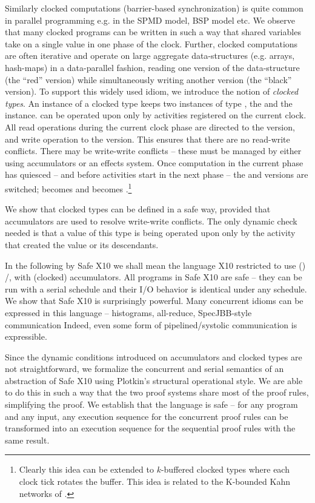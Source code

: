 Similarly clocked computations (barrier-based synchronization) is
quite common in parallel programming e.g. in the SPMD model, BSP model
etc. We observe that many clocked programs can be written in such a
way that shared variables take on a single value in one phase of the
clock. Further, clocked computations are often iterative and operate
on large aggregate data-structures (e.g. arrays, hash-maps) in a
data-parallel fashion, reading one version of the data-structure (the
``red'' version) while simultaneously writing another version (the
 ``black'' version). To support this widely used idiom, we introduce
the notion of {\em clocked types}. An instance  of a  clocked type
 keeps two instances of type , the  and
the  instance.  can be operated upon only by
activities registered on the current clock.  All read operations
during the current clock phase are directed to the  version,
and write operation to the  version. This ensures that
there are no read-write conflicts. There may be write-write conflicts
-- these must be managed by either using accumulators or an effects
system. Once computation in the current phase has quiesced -- and
before activities start in the next phase -- the  and
 versions are switched;  becomes  and
 becomes .\footnote{Clearly this idea can be
  extended to $k$-buffered clocked types where each clock tick rotates
  the buffer. This idea is related to the K-bounded Kahn networks of 
\cite{Cohen:2006:NSK:1111320.1111054}.}


We show that clocked types can be defined in a safe way, provided that
accumulators are used to resolve write-write conflicts. The only
dynamic check needed is that a value of this type is being operated
upon only by the activity that created the value or its
descendants. 

In the following by Safe X10 we shall mean the language X10 restricted
to use () /,  with
(clocked) accumulators.  All programs in Safe X10 are safe -- they can
be run with a serial schedule and their I/O behavior is identical
under any schedule.  We show that Safe X10 is surprisingly
powerful. Many concurrent idioms can be expressed in this language --
histograms, all-reduce, SpecJBB-style communication Indeed, even some
form of pipelined/systolic communication is expressible.

Since the dynamic conditions introduced on accumulators and clocked
types are not straightforward, we formalize the concurrent and serial
semantics of an abstraction of Safe X10 using Plotkin's structural
operational style. We are able to do this in such a way that the two
proof systems share most of the proof rules, simplifying the proof. We
establish that the language is safe -- for any program and any input,
any execution sequence for the concurrent proof rules can be
transformed into an execution sequence for the sequential proof rules
with the same result. 

